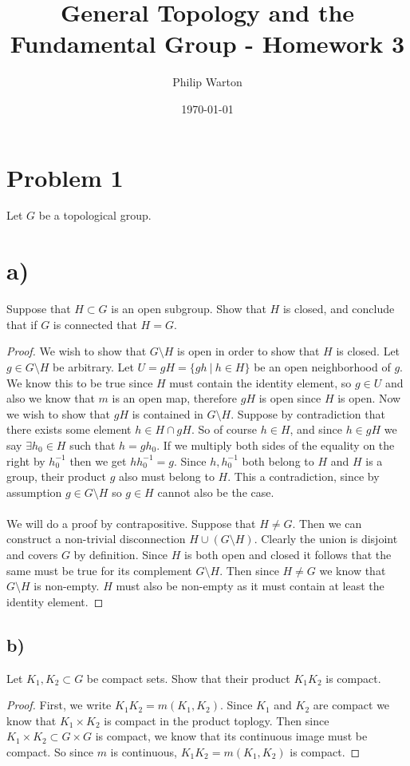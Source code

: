 \documentclass{article}
\theoremstyle{definition}
\begin{document}
\title{General Topology and the Fundamental Group - Homework 3}
\author{Philip Warton}
\date{\today}
\maketitle
\section*{Problem 1}
Let $G$ be a topological group.
\section*{a)}
\begin{mdframed}[]
    Suppose that $H \subset G$ is an open subgroup. Show that $H$ is closed, and conclude that if $G$ is connected that $H = G$.
\end{mdframed}
\begin{proof}
     We wish to show that $G \setminus H$ is open in order to show that $H$
    is closed. Let $g \in G \setminus H$ be arbitrary. Let $U = gH = \{gh \ | \ h \in H\}$ be 
    an open neighborhood of $g$. We know this to be true since $H$ must contain the identity element,
    so $g \in U$ and also we know that $m$ is an open map, therefore $gH$ is open since $H$ is open.
    Now we wish to show that $gH$ is contained in $G \setminus H$. Suppose by contradiction that
    there exists some element $h \in H \cap gH$. So of course $h \in H$, and since $h \in gH$
    we say $\exists h_0 \in H$ such that $h = gh_0$. If we multiply both sides of the equality on the 
    right by $h_0^{-1}$ then we get $hh_0^{-1} = g$. Since $h, h_0^{-1}$ both belong to $H$ and 
    $H$ is a group, their product $g$ also must belong to $H$. This a contradiction, since by 
    assumption $g \in G \setminus H$ so $g \in H$ cannot also be the case. \\\\
     We will do a proof by contrapositive. Suppose that $H \neq G$.
    Then we can construct a non-trivial disconnection $H \cup (G \setminus H)$. Clearly the union is disjoint and covers $G$ by definition.
    Since $H$ is both open and closed it 
    follows that the same must be true for its complement $G \setminus H$. Then since $H \neq G$ we know that $G \setminus H$
    is non-empty. $H$ must also be non-empty as it must contain at least the identity element.
\end{proof}
\subsection*{b)}
\begin{mdframed}[]
    Let $K_1,K_2 \subset G$ be compact sets. Show that their product $K_1K_2$ is compact.
\end{mdframed}
\begin{proof}
    First, we write $K_1K_2 = m(K_1,K_2)$. Since $K_1$ and $K_2$ are compact we know that $K_1 \times K_2$ is compact
    in the product toplogy. Then since $K_1 \times K_2 \subset G \times G$ is compact, we know that its continuous image 
    must be compact. So since $m$ is continuous, $K_1K_2 = m(K_1,K_2)$ is compact.
\end{proof}
\end{document}
